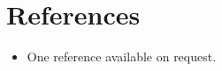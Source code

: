 \documentclass[11pt,a4paper,sans]{moderncv}        %
\begin{document}
\section{References}

\vspace{6pt}
 
\begin{itemize}

\item{One reference available on request.}

\end{itemize}

\nocite{*}



\end{document}
